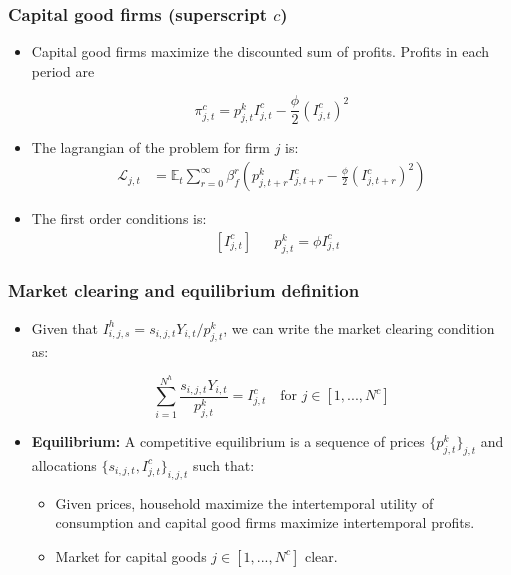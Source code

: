 \documentclass[11pt]{article}
\newcommand{\E}{\mathbb{E}}
\numberwithin{equation}{section}
\begin{document}
\subsubsection{Capital good firms (superscript $c$)}


\begin{itemize}
	
	\item Capital good firms maximize the discounted sum of profits. Profits in each period are
	
	$$\pi^c_{j,t}=p^k_{j,t} I^c_{j,t}-\frac{\phi}{2} \left(I^c_{j,t}\right)^2  $$
	
	
	\item The lagrangian of the problem for firm $j$ is:
	\begin{align*}
	\mathcal{L}_{j,t} &= \E_t \sum_{r=0}^{\infty}\beta^r_f \left(
	p^k_{j,t+r} I^c_{j,t+r}-\frac{\phi}{2} \left(I^c_{j,t+r}\right)^2 \right)
	\end{align*}
	
	\item The first order conditions is:
	\begin{align}
	& \left[I^c_{j,t}\right]&& p^k_{j,t} = \phi I^c_{j,t}
	\end{align}
	
	\end{itemize}
	\subsubsection{Market clearing and equilibrium definition}
	
	\begin{itemize}
		\item Given that $I^h_{i,j,s} = s_{i,j,t} Y_{i,t} /p^k_{j,t}$, we can write the market clearing condition as:
		
		$$ \sum_{i=1}^{N^h} \frac{ s_{i,j,t} Y_{i,t} }{p^k_{j,t}} = I^c_{j,t} \quad \text{for } j \in [1,...,N^c]$$
		
		\item \textbf{Equilibrium:} A competitive equilibrium is a sequence of prices $\{p^k_{j,t}\}_{j,t}$ and allocations $\{s_{i,j,t}, I^c_{j,t} \}_{i,j,t}$ such that:
		
		\begin{itemize}
			\item Given prices, household maximize the intertemporal utility of consumption and capital good firms maximize intertemporal profits.
			
			\item Market for capital goods $j \in [1,...,N^c]$ clear.
		\end{itemize}

	\end{itemize}
\end{document}
